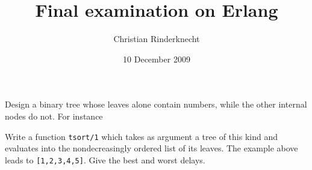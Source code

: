 \documentclass[11pt,a4paper]{article}
\title{Final examination on Erlang}
\author{Christian Rinderknecht}
\date{10 December 2009}
\newcommand\erlcode[1]{\texttt{#1}}
\begin{document}
\maketitle

\thispagestyle{empty}

Design a binary tree whose leaves alone contain numbers, while the
other internal nodes do not. For instance
\begin{center}
\end{center}
Write a function \erlcode{tsort/1} which takes as argument a tree of
this kind and evaluates into the nondecreasingly ordered list of its
leaves. The example above leads to \erlcode{[1,2,3,4,5]}. Give the
best and worst delays.
\end{document}
